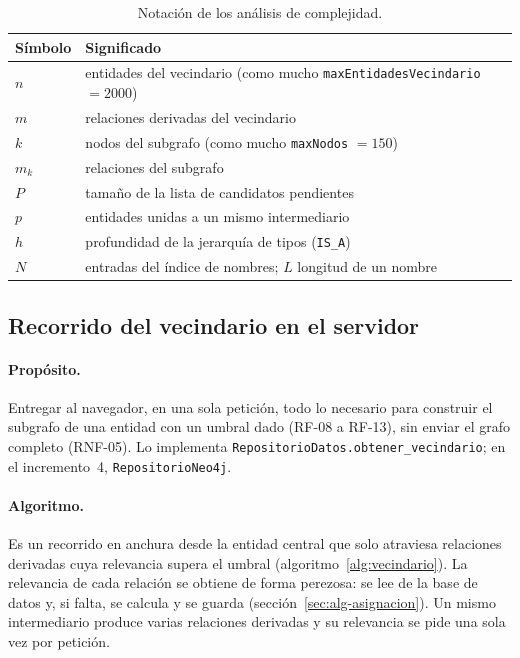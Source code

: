 \begin{table}[htbp]
  \centering
  \caption{Notación de los análisis de complejidad.}
  \label{tab:notacion}
  \begin{tabular}{@{}ll@{}}
    \toprule
    Símbolo & Significado \\
    \midrule
    $n$ & entidades del vecindario (como mucho \texttt{maxEntidadesVecindario} $=2000$) \\
    $m$ & relaciones derivadas del vecindario \\
    $k$ & nodos del subgrafo (como mucho \texttt{maxNodos} $=150$) \\
    $m_k$ & relaciones del subgrafo \\
    $P$ & tamaño de la lista de candidatos pendientes \\
    $p$ & entidades unidas a un mismo intermediario \\
    $h$ & profundidad de la jerarquía de tipos (\texttt{IS\_A}) \\
    $N$ & entradas del índice de nombres; $L$ longitud de un nombre \\
    \bottomrule
  \end{tabular}
\end{table}

\subsection{Recorrido del vecindario en el servidor}
\label{sec:alg-vecindario}

\paragraph{Propósito.} Entregar al navegador, en una sola petición, todo lo necesario para construir el subgrafo de una entidad con un umbral dado (RF-08 a RF-13), sin enviar el grafo completo (RNF-05). Lo implementa \texttt{RepositorioDatos.obtener\_vecindario}; en el incremento~4, \texttt{RepositorioNeo4j}.

\paragraph{Algoritmo.} Es un recorrido en anchura desde la entidad central que solo atraviesa relaciones derivadas cuya relevancia supera el umbral (algoritmo~\ref{alg:vecindario}). La relevancia de cada relación se obtiene de forma perezosa: se lee de la base de datos y, si falta, se calcula y se guarda (sección~\ref{sec:alg-asignacion}). Un mismo intermediario produce varias relaciones derivadas y su relevancia se pide una sola vez por petición.

